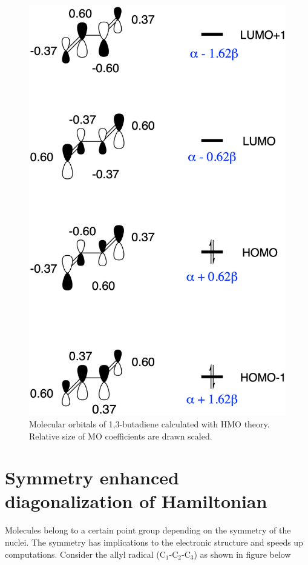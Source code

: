 \documentclass{article}
\begin{document}
\begin{figure}[h]
\centering
\includegraphics[scale=0.5]{./images/mos_1-3-butadiene.png}
\caption{Molecular orbitals of 1,3-butadiene calculated with HMO theory. Relative size of MO coefficients are drawn scaled.}
\label{fig:mos_butadiene}
\end{figure}



\clearpage
\section*{Symmetry enhanced diagonalization of Hamiltonian}

Molecules belong to a certain point group depending on the symmetry of the nuclei. The symmetry has implications to the electronic structure and speeds up computations. Consider the allyl radical (C$_1$-C$_2$-C$_3$) as shown in figure below
\end{document}
